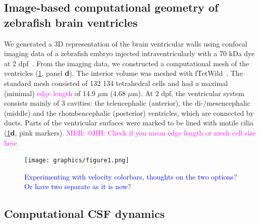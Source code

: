 \documentclass[fleqn]{wlscirep}
\newcommand{\lyng}[1]{\textcolor{blue}{#1}}
\newcommand{\mer}[1]{\textcolor{magenta}{#1}}
\begin{document}
\subsection*{Image-based computational geometry of zebrafish brain ventricles}
We generated a 3D representation of the brain ventricular walls using confocal imaging data of a zebrafish embryo injected intraventricularly with a 70 kDa dye at 2 dpf~\cite{Olstad2019CiliaryDevelopment}. From the imaging data, we constructed a computational mesh of the ventricles (\cref{fig:figure1}, panel \textbf{d}). The interior volume was meshed with fTetWild~\cite{Hu2020FastWild}. The standard mesh consisted of 132 134 tetrahedral cells and had a maximal (minimal) \mer{edge length} of 14.9 $\mu$m (4.68 $\mu$m). At 2 dpf, the ventricular system consists mainly of 3 cavities: the telencephalic  (anterior), the di-/mesencephalic  (middle) and the rhombencephalic (posterior) ventricles, which are connected by ducts. Parts of the ventricular surfaces were marked to be lined with motile cilia~\cite{Olstad2019CiliaryDevelopment} (\cref{fig:figure1}\textbf{d}, pink markers).
\mer{MER: @HH: Check if you mean edge length or mesh cell size here.}
\begin{figure}%
    \centering
    \texttt{[image: graphics/figure1.png]}
    \caption{\lyng{Experimenting with velocity colorbars, thoughts on the two options? Or have two separate as it is now?}}
    \label{fig:figure1}
\end{figure}


\subsection*{Computational CSF dynamics}
\end{document}
